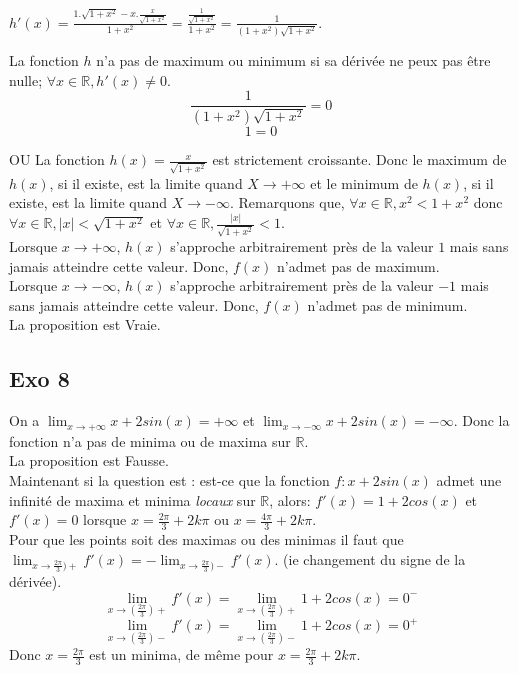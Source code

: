 \documentclass[]{book}
\theoremstyle{definition}
\newcommand{\bb}[1]{\mathbb{#1}}
\newcommand{\R}{\bb{R}}
\begin{document}
$h'(x) = \frac{1.\sqrt{1+x^2} - x.\frac{x}{\sqrt{1+x^2}}}{1+x^2} = \frac{\frac{1}{\sqrt{1+x^2}}}{1+x^2} = \frac{1}{(1+x^2)\sqrt{1+x^2}}$.

La fonction $h$ n'a pas de maximum ou minimum si sa d\'eriv\'ee ne peux pas \^etre nulle; $\forall x \in \R, h'(x) \neq 0$.
$$ \frac{1}{(1+x^2)\sqrt{1+x^2}} = 0 $$
$$ 1 = 0 $$


OU
La fonction $h(x) = \frac{x}{\sqrt{1+x^2}}$ est strictement croissante. Donc le maximum de $h(x)$, si il existe, est la limite quand $X \to +\infty$ et le minimum de $h(x)$, si il existe, est la limite quand $X \to -\infty$.
Remarquons que, $\forall x \in \R, x^2 < 1 + x^2$ donc $\forall x \in \R, |x| < \sqrt{1 + x^2}$ et $\forall x \in \R, \frac{|x|}{\sqrt{1 + x^2}} < 1$.\\
 
Lorsque $x \to +\infty$, $h(x)$ s'approche arbitrairement pr\`es de la valeur $1$ mais sans jamais atteindre cette valeur. Donc, $f(x)$ n'admet pas de maximum.\\

Lorsque $x \to -\infty$, $h(x)$ s'approche arbitrairement pr\`es de la valeur $-1$ mais sans jamais atteindre cette valeur. Donc, $f(x)$ n'admet pas de minimum.\\


La proposition est Vraie.



\subsection*{Exo 8}
On a $\lim_{x \to +\infty} x + 2sin(x) = +\infty$ et $\lim_{x \to -\infty} x + 2sin(x) = -\infty$. Donc la fonction n'a pas de minima ou de maxima sur $\R$.\\

La proposition est Fausse.\\

Maintenant si la question est : est-ce que la fonction $f: x + 2sin(x)$ admet une infinit\'e de maxima et minima \emph{locaux} sur $\R$, alors: $f'(x) = 1 + 2cos(x)$ et $f'(x) = 0$ lorsque $x = \frac{2\pi}{3} + 2k\pi$ ou $x = \frac{4\pi}{3} + 2k\pi$.\\
Pour que les points soit des maximas ou des minimas il faut que $\lim_{x \to \frac{2\pi}{3})+} f'(x) = -\lim_{x \to \frac{2\pi}{3})-} f'(x)$. (ie changement du signe de la d\'eriv\'ee).
$$\lim_{x \to (\frac{2\pi}{3})+} f'(x) = \lim_{x \to (\frac{2\pi}{3})+} 1 + 2cos(x) = 0^-$$ 
$$\lim_{x \to (\frac{2\pi}{3})-} f'(x) = \lim_{x \to (\frac{2\pi}{3})-} 1 + 2cos(x) = 0^+$$  
Donc  $x=\frac{2\pi}{3}$ est un minima, de m\^eme pour $x=\frac{2\pi}{3} + 2k\pi$. \\
\end{document}
